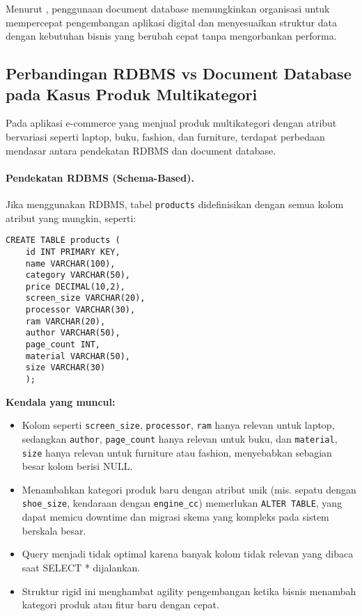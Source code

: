 Menurut \cite{gandomi2015}, penggunaan document database memungkinkan organisasi untuk mempercepat pengembangan aplikasi digital dan menyesuaikan struktur data dengan kebutuhan bisnis yang berubah cepat tanpa mengorbankan performa.

\subsection{Perbandingan RDBMS vs Document Database pada Kasus Produk Multikategori}

Pada aplikasi e-commerce yang menjual produk multikategori dengan atribut bervariasi seperti laptop, buku, fashion, dan furniture, terdapat perbedaan mendasar antara pendekatan RDBMS dan document database.

\paragraph{Pendekatan RDBMS (Schema-Based).}

Jika menggunakan RDBMS, tabel \texttt{products} didefinisikan dengan semua kolom atribut yang mungkin, seperti:

\begin{lstlisting}[style=SqlStyle]
	CREATE TABLE products (
	id INT PRIMARY KEY,
	name VARCHAR(100),
	category VARCHAR(50),
	price DECIMAL(10,2),
	screen_size VARCHAR(20),
	processor VARCHAR(30),
	ram VARCHAR(20),
	author VARCHAR(50),
	page_count INT,
	material VARCHAR(50),
	size VARCHAR(30)
	);
\end{lstlisting}

\textbf{Kendala yang muncul:}
\begin{itemize}
	\item Kolom seperti \texttt{screen\_size}, \texttt{processor}, \texttt{ram} hanya relevan untuk laptop, sedangkan \texttt{author}, \texttt{page\_count} hanya relevan untuk buku, dan \texttt{material}, \texttt{size} hanya relevan untuk furniture atau fashion, menyebabkan sebagian besar kolom berisi NULL.
	\item Menambahkan kategori produk baru dengan atribut unik (mis. sepatu dengan \texttt{shoe\_size}, kendaraan dengan \texttt{engine\_cc}) memerlukan \texttt{ALTER TABLE}, yang dapat memicu downtime dan migrasi skema yang kompleks pada sistem berskala besar.
	\item Query menjadi tidak optimal karena banyak kolom tidak relevan yang dibaca saat SELECT * dijalankan.
	\item Struktur rigid ini menghambat agility pengembangan ketika bisnis menambah kategori produk atau fitur baru dengan cepat.
\end{itemize}

